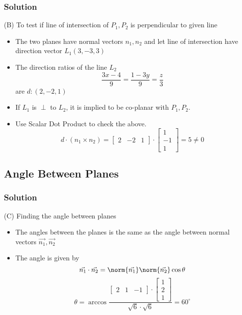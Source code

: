 \documentclass{beamer}
\begin{document}
\begin{frame}
\frametitle{Solution}

(B) To test if line of intersection of $P_{1},P_{2}$ is perpendicular to given line 
\begin{itemize}
\item<1-> The two planes have normal vectors $n_{1},n_{2}$ and let line of intersection have direction vector $L_{1}(3,-3,3)$
\item<2-> The direction ratios of the line $L_{2}$
\[
    \frac{3x-4}{9} = \frac{1-3y}{9}=\frac{z}{3}
\] are $d: (2,-2,1)$
\item<3-> If $L_{1}$ is $\perp$ to $L_{2}$, it is implied to be co-planar with $P_{1},P_{2}$.
\item<4-> Use Scalar Dot Product to check the above.
    \[
        d\cdot(n_{1}\times n_{2})=
        \begin{bmatrix}
        2 & -2 & 1
        \end{bmatrix}
        \cdot
        \begin{bmatrix}
        1\\-1\\ 1
        \end{bmatrix}
        = 5 \neq 0
        
    \]
\end{itemize}
\end{frame}
 
 \subsection{Angle Between Planes}
\begin{frame}
\frametitle{Solution}

(C) Finding the angle between planes
\begin{itemize}
\item<1-> The angles between the planes is the same as the angle between normal vectors $\vec{n_{1}},\vec{n_{2}}$
\item<2-> The angle is given by
    \[
    \vec{n_{1}}\cdot\vec{n_{2}} =\norm{\vec{n_{1}}} \norm{\vec{n_{2}}} \cos \theta
    \]
    \[
    \theta = \arccos{\frac{\begin{bmatrix}2 & 1 & -1\end{bmatrix}\cdot \begin{bmatrix}1\\2\\1\end{bmatrix}}{\sqrt{6}\cdot\sqrt{6}}} = 60^\circ
    \]
    
    
\end{itemize}
\end{frame}
\end{document}
